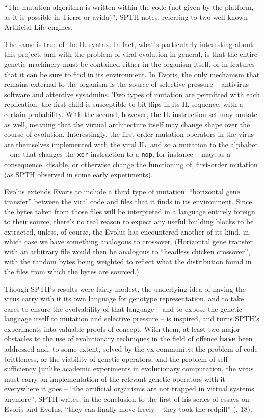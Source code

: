 \documentclass[12pt,glossary]{dalthesis}
\begin{document}
``The mutation algorithm is written within the code (not given by the platform,
as it is possible in Tierre or avida)'', SPTH notes, referring to two well-known
Artificial Life engines. \cite{spth10a}

The same is true of the IL syntax. In fact, what's particularly interesting
about this project, and with the problem of viral evolution in general, is that
the entire genetic machinery must be contained either in the organism itself, or
in features that it can be sure to find in its environment. In Evoris, the only
mechanism that remains external to the organism is the source of selective
pressure -- antivirus software and attentive sysadmins. Two types of mutation
are permitted with each replication: the first child is susceptible to bit flips
in its IL sequence, with a certain probability. With the second, however, the IL
instruction set may mutate as well, meaning that the virtual architecture itself
may change shape over the course of evolution. Interestingly, the first-order
mutation operators in the virus are themselves implemented with the viral IL,
and so a mutation to the alphabet -- one that changes the \texttt{xor} instruction to a
\texttt{nop}, for instance -- may, as a consequence, disable, or otherwise change the
functioning of, first-order mutation (as SPTH observed in some early
experiments).

Evolus extends Evoris to include a third type of mutation: ``horizontal gene
transfer'' between the viral code and files that it finds in its environment.
Since the bytes taken from those files will be interpreted in a language
entirely foreign to their source, there's no real reason to expect any useful
building blocks to be extracted, unless, of course, the Evolus has encountered
another of its kind, in which case we have something analogous to crossover.
(Horizontal gene transfer with an arbitrary file would then be analogous to
``headless chicken crossover'', with the random bytes being weighted to reflect
what the distribution found in the files from which the bytes are sourced.)

Though SPTH's results were fairly modest, the underlying idea of having the
virus carry with it its own language for genotype representation, and to take
cares to ensure the evolvability of that language -- and to expose the genetic
language itself to mutation and selective pressure -- is inspired, and turns
SPTH's experiments into valuable proofs of concept.
With them, at least two major obstacles to the use of evolutionary techniques
in the field of offence \textbf{have} been addressed and, to some extent, solved by the
\gls{vx} community: the problem of code brittleness, or the viability of genetic
operators, and the problem of self-sufficiency (unlike academic experiments in
evolutionary computation, the virus must carry an implementation of the relevant
genetic operators with it everywhere it goes -- ``the artificial organisms are
not trapped in virtual systems anymore'', SPTH writes, in the conclusion to the
first of his series of essays on Evoris and Evolus, ``they can finally move
freely -- they took the redpill'' (\cite{spth10a}, 18).
\end{document}
